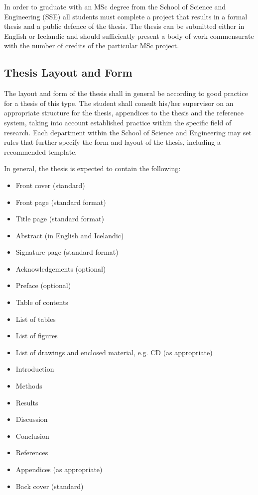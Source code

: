 In order to graduate with an MSc degree from the School of Science and Engineering (SSE) all students must complete a project that results in a formal thesis and a public defence of the thesis.
The thesis can be submitted either in English or Icelandic and should sufficiently present a body of work commensurate with the number of credits of the particular MSc project.
\subsection{Thesis Layout and Form}
The layout and form of the thesis shall in general be according to good practice for a thesis of this type. The student shall consult his/her supervisor on an appropriate structure for the thesis, appendices to the thesis and the reference system, taking into account established practice within the specific field of research. Each department within the School of Science and Engineering may set rules that further specify the form and layout of the thesis, including a recommended template.

In general, the thesis is expected to contain the following:
\begin{itemize}
\item Front cover (standard)
\item Front page (standard format)
\item Title page (standard format)
\item Abstract (in English and Icelandic)
\item Signature page (standard format)
\item Acknowledgements (optional)
\item Preface (optional)
\item Table of contents
\item List of tables
\item List of figures
\item List of drawings and enclosed material, e.g. CD (as appropriate)
\item Introduction
\item Methods
\item Results
\item Discussion
\item Conclusion
\item References
\item Appendices (as appropriate)
\item Back cover (standard)
\end{itemize}

